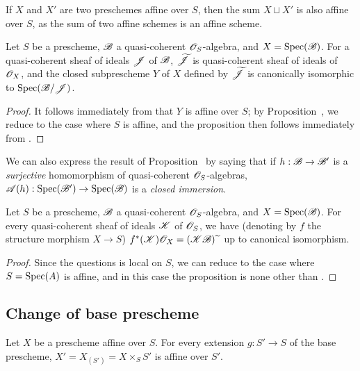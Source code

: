 \begin{remark}[1.4.9]
\label{II.1.4.9}
If $X$ and $X'$ are two preschemes affine over $S$, then the sum $X\sqcup X'$ is also affine over $S$, as the sum of two affine schemes is an affine scheme.
\end{remark}

\begin{proposition}[1.4.10]
\label{II.1.4.10}
Let $S$ be a prescheme, $\mathscr{B}$ a quasi-coherent $\mathscr{O}_S$-algebra, and $X=\operatorname{Spec}(\mathscr{B})$.
For a quasi-coherent sheaf of ideals $\mathscr{J}$ of $\mathscr{B}$, $\widetilde{\mathscr{J}}$ is quasi-coherent sheaf of ideals of $\mathscr{O}_X$, and the closed subprescheme $Y$ of $X$ defined by $\widetilde{\mathscr{J}}$ is canonically isomorphic to $\operatorname{Spec}(\mathscr{B}/\mathscr{J})$.
\end{proposition}

\begin{proof}
It follows immediately from  that $Y$ is affine over $S$; by Proposition~, we reduce to the case where $S$ is affine, and the proposition then follows immediately from .
\end{proof}

We can also express the result of Proposition~ by saying that if $h:\sh{B}\to\sh{B}'$ is a \emph{surjective} homomorphism of quasi-coherent $\mathscr{O}_S$-algebras, $\sh{A}(h):\Spec(\sh{B}')\to\Spec(\sh{B})$ is a \emph{closed immersion}.

\begin{proposition}[1.4.11]
\label{II.1.4.11}
Let $S$ be a prescheme, $\mathscr{B}$ a quasi-coherent $\mathscr{O}_S$-algebra, and $X=\operatorname{Spec}(\mathscr{B})$.
For every quasi-coherent sheaf of ideals $\mathscr{K}$ of $\mathscr{O}_S$, we have (denoting by $f$ the structure morphism $X\to S$) $f^*(\mathscr{K})\mathscr{O}_X=(\mathscr{K}\mathscr{B}){\,\widetilde{\,}\,}$ up to canonical isomorphism.
\end{proposition}

\begin{proof}
Since the questions is local on $S$, we can reduce to the case where $S=\operatorname{Spec}(A)$ is affine, and in this case the proposition is none other than .
\end{proof}

\subsection{Change of base prescheme}
\label{subsection:II.1.5}

\begin{proposition}[1.5.1]
\label{II.1.5.1}
Let $X$ be a prescheme affine over $S$.
For every extension $g:S'\to S$ of the base prescheme, $X'=X_{(S')}=X\times_S S'$ is affine over $S'$.
\end{proposition}

